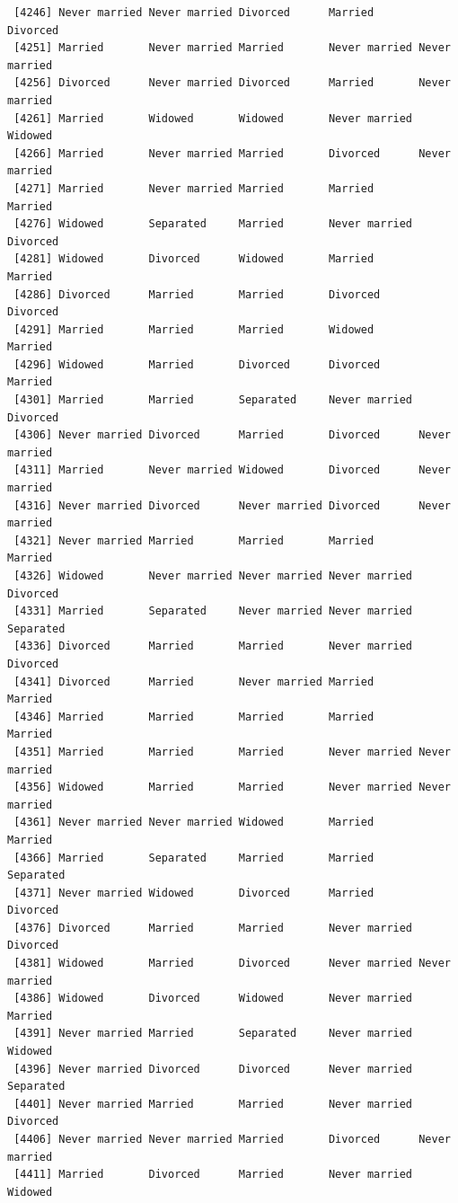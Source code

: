 \documentclass[
  letterpaper,
  DIV=11,
  numbers=noendperiod,
  oneside]{scrartcl}
\begin{document}
\begin{verbatim}
 [4246] Never married Never married Divorced      Married       Divorced     
 [4251] Married       Never married Married       Never married Never married
 [4256] Divorced      Never married Divorced      Married       Never married
 [4261] Married       Widowed       Widowed       Never married Widowed      
 [4266] Married       Never married Married       Divorced      Never married
 [4271] Married       Never married Married       Married       Married      
 [4276] Widowed       Separated     Married       Never married Divorced     
 [4281] Widowed       Divorced      Widowed       Married       Married      
 [4286] Divorced      Married       Married       Divorced      Divorced     
 [4291] Married       Married       Married       Widowed       Married      
 [4296] Widowed       Married       Divorced      Divorced      Married      
 [4301] Married       Married       Separated     Never married Divorced     
 [4306] Never married Divorced      Married       Divorced      Never married
 [4311] Married       Never married Widowed       Divorced      Never married
 [4316] Never married Divorced      Never married Divorced      Never married
 [4321] Never married Married       Married       Married       Married      
 [4326] Widowed       Never married Never married Never married Divorced     
 [4331] Married       Separated     Never married Never married Separated    
 [4336] Divorced      Married       Married       Never married Divorced     
 [4341] Divorced      Married       Never married Married       Married      
 [4346] Married       Married       Married       Married       Married      
 [4351] Married       Married       Married       Never married Never married
 [4356] Widowed       Married       Married       Never married Never married
 [4361] Never married Never married Widowed       Married       Married      
 [4366] Married       Separated     Married       Married       Separated    
 [4371] Never married Widowed       Divorced      Married       Divorced     
 [4376] Divorced      Married       Married       Never married Divorced     
 [4381] Widowed       Married       Divorced      Never married Never married
 [4386] Widowed       Divorced      Widowed       Never married Married      
 [4391] Never married Married       Separated     Never married Widowed      
 [4396] Never married Divorced      Divorced      Never married Separated    
 [4401] Never married Married       Married       Never married Divorced     
 [4406] Never married Never married Married       Divorced      Never married
 [4411] Married       Divorced      Married       Never married Widowed      

\end{verbatim}
\end{document}
